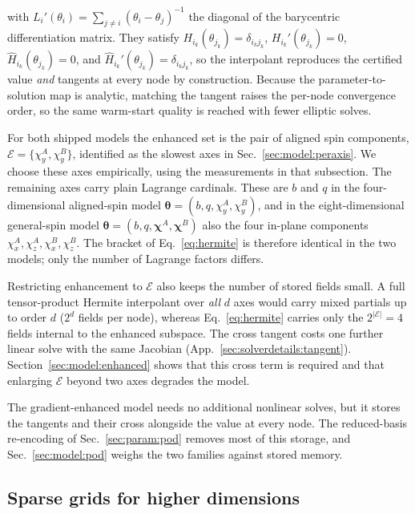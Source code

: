 \documentclass[
  aps,
  prd,
  twocolumn,
  10pt,
  amsmath,
  amssymb,
  nofootinbib,
  superscriptaddress,
  floatfix,
]{revtex4-2}
\newcommand{\vect}[1]{\boldsymbol{#1}}
\begin{document}
with $L_i'(\theta_i)=\sum_{j\neq i}(\theta_i-\theta_j)^{-1}$ the diagonal of the
barycentric differentiation matrix. They satisfy
$H_{i_k}(\theta_{j_k})=\delta_{i_k j_k}$, $H_{i_k}'(\theta_{j_k})=0$,
$\hat H_{i_k}(\theta_{j_k})=0$, and $\hat H_{i_k}'(\theta_{j_k})=\delta_{i_k j_k}$, so
the interpolant reproduces the certified value \emph{and} tangents at every node by
construction. Because the
parameter-to-solution map is analytic, matching the tangent raises the per-node
convergence order, so the same warm-start quality is reached with fewer
elliptic solves.

For both shipped models the enhanced set is the pair of aligned spin components,
$\mathcal{E}=\{\chi^{A}_{y},\chi^{B}_{y}\}$, identified as the slowest axes in
Sec.~\ref{sec:model:peraxis}. We choose these axes empirically, using the measurements in that subsection.
The remaining axes carry plain Lagrange cardinals.
These are $b$ and $q$ in the four-dimensional aligned-spin model
$\vect{\theta}=(b,q,\chi^{A}_{y},\chi^{B}_{y})$, and in the
eight-dimensional general-spin model
$\vect{\theta}=(b,q,\boldsymbol{\chi}^{A},\boldsymbol{\chi}^{B})$ also the four
in-plane components $\chi^{A}_{x},\chi^{A}_{z},\chi^{B}_{x},\chi^{B}_{z}$. The bracket of
Eq.~\eqref{eq:hermite} is therefore identical in the two models; only the number of
Lagrange factors differs.

Restricting enhancement to $\mathcal{E}$ also keeps the number of stored fields small.
A full tensor-product Hermite interpolant over \emph{all} $d$ axes would carry mixed partials up to order $d$ ($2^d$ fields per node), whereas Eq.~\eqref{eq:hermite} carries only the $2^{|\mathcal{E}|}=4$ fields internal to the enhanced subspace.
The cross tangent costs one further linear solve with the same Jacobian (App.~\ref{sec:solverdetails:tangent}).
Section~\ref{sec:model:enhanced} shows that this cross term is required and that enlarging $\mathcal{E}$ beyond two axes degrades the model.

The gradient-enhanced model needs no additional nonlinear solves, but it stores the tangents and their cross alongside the value at every node.
The reduced-basis re-encoding of Sec.~\ref{sec:param:pod} removes most of this storage, and Sec.~\ref{sec:model:pod} weighs the two families against stored memory.

\subsection{Sparse grids for higher dimensions}
\label{sec:param:smolyak}
\end{document}
